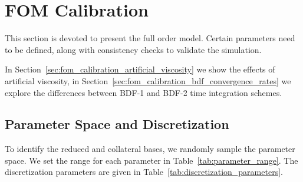 \documentclass[../../thesis.tex]{subfiles}
\begin{document}
\section{FOM Calibration}
\label{sec:fom_calibration}
This section is devoted to present the full order model.
Certain parameters need to be defined,
along with consistency checks to validate the simulation.

In Section~\ref{sec:fom_calibration_artificial_viscosity} we show the effects of artificial viscosity,
in Section~\ref{sec:fom_calibration_bdf_convergence_rates} we explore the differences 
between BDF-1 and BDF-2 time integration schemes.


\subsection{Parameter Space and Discretization}
To identify the reduced and collateral bases,
we randomly sample the parameter space.
We set the range for each parameter in Table~\ref{tab:parameter_range}.
The discretization parameters are given in Table~\ref{tab:discretization_parameters}.
\end{document}
